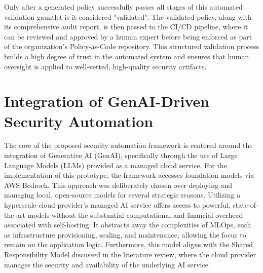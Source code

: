 Only after a generated policy successfully passes all stages of this automated validation gauntlet is it considered "validated". The validated policy, along with its comprehensive audit report, is then passed to the CI/CD pipeline, where it can be reviewed and approved by a human expert before being enforced as part of the organization's Policy-as-Code repository. This structured validation process builds a high degree of trust in the automated system and ensures that human oversight is applied to well-vetted, high-quality security artifacts.



\section{Integration of GenAI-Driven Security Automation} %
\label{sub:Integration of GenAI-Driven Security Automation}

The core of the proposed security automation framework is centered around the integration of Generative AI (GenAI), specifically through the use of Large Language Models (LLMs) provided as a managed cloud service. For the implementation of this prototype, the framework accesses foundation models via AWS Bedrock. This approach was deliberately chosen over deploying and managing local, open-source models for several strategic reasons. Utilizing a hyperscale cloud provider's managed AI service offers access to powerful, state-of-the-art models without the substantial computational and financial overhead associated with self-hosting. It abstracts away the complexities of MLOps, such as infrastructure provisioning, scaling, and maintenance, allowing the focus to remain on the application logic. Furthermore, this model aligns with the Shared Responsibility Model discussed in the literature review, where the cloud provider manages the security and availability of the underlying AI service.

